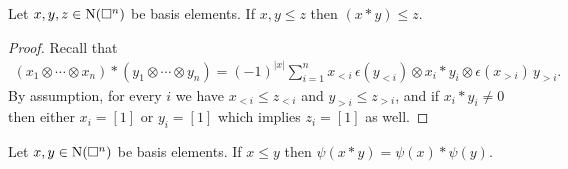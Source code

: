 \begin{lemma}
	Let $x, y, z \in \operatorname{N}(\square^n)$ be basis elements.
	If $x, y \leq z$ then $(x \ast y) \leq z$.
\end{lemma}

\begin{proof}
	Recall that
	\begin{align*}
	(x_1 \otimes \cdots \otimes x_n) \ast (y_1 \otimes \cdots \otimes y_n) =
	(-1)^{|x|} \sum_{i=1}^n x_{<i}\, \epsilon(y_{<i}) \otimes x_i \ast y_i \otimes \epsilon(x_{>i}) \, y_{>i}.
	\end{align*}
	By assumption, for every $i$ we have $x_{<i} \leq z_{<i}$ and $y_{>i} \leq z_{>i}$, and if $x_i \ast y_i \neq 0$ then either $x_i = [1]$ or $y_i = [1]$ which implies $z_i = [1]$ as well.
\end{proof}

\begin{lemma}
	Let $x, y \in \operatorname{N}(\square^n)$ be basis elements.
	If $x \leq y$ then $\psi(x \ast y) = \psi(x) \ast \psi(y)$.
\end{lemma}

